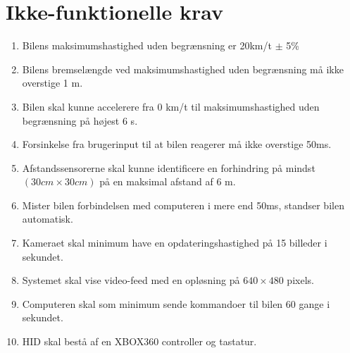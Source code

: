 \section{Ikke-funktionelle krav}
\begin{enumerate}\itemsep1pt \parskip0pt 
	\item Bilens maksimumshastighed uden begrænsning er 20km/t $\pm$ 5\% %
	\item Bilens bremselængde ved maksimumshastighed uden begrænsning må ikke overstige 1 m. %
	\item Bilen skal kunne accelerere fra 0 km/t til maksimumshastighed uden begrænsning på højest 6 s. %
	\item Forsinkelse fra brugerinput til at bilen reagerer må ikke overstige 50ms. %
	\item Afstandssensorerne skal kunne identificere en forhindring på mindst $(30cm \times 30cm)$ på en maksimal afstand af 6 m. %
	\item Mister bilen forbindelsen med computeren i mere end 50ms, standser bilen automatisk. 
	\item Kameraet skal minimum have en opdateringshastighed på 15 billeder i sekundet. %
	\item Systemet skal vise video-feed med en opløsning på $640 \times 480$ pixels.
	\item Computeren skal som minimum sende kommandoer til bilen 60 gange i sekundet. 
	\item HID skal bestå af en XBOX360 controller og tastatur.
\end{enumerate}
\clearpage